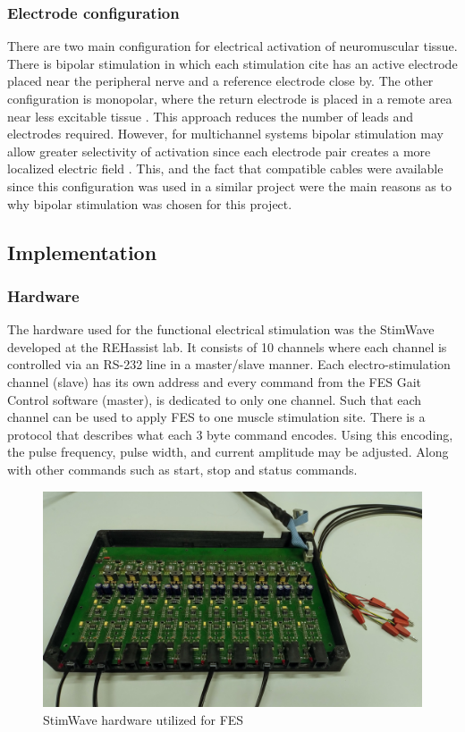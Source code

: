 \subsubsection{Electrode configuration}
There are two main configuration for electrical activation of neuromuscular tissue. There is bipolar stimulation in which each stimulation cite has an active electrode placed near the peripheral nerve and a reference electrode close by. The other configuration is monopolar, where the return electrode is placed in a remote area near less excitable tissue \cite{peckham_functional_2005}. 
This approach reduces the number of leads and electrodes required. However, for multichannel systems bipolar stimulation may allow greater selectivity of activation since each electrode pair creates a more localized electric field \cite{grandjean_recruitment_1986}. This, and the fact that compatible cables were available since this configuration was used in a similar project were the main reasons as to why bipolar stimulation was chosen for this project.

\subsection{Implementation}
\subsubsection{Hardware}
The hardware used for the functional electrical stimulation was the StimWave developed at the REHassist lab. It consists of 10 channels where each channel is controlled via an RS-232 line in a master/slave manner. Each electro-stimulation channel (slave) has its own address and every command from the FES Gait Control software (master), is dedicated to only one channel. Such that each channel can be used to apply FES to one muscle stimulation site. There is a protocol that describes what each 3 byte command encodes. Using this encoding, the pulse frequency, pulse width, and current amplitude may be adjusted. Along with other commands such as start, stop and status commands. 

\begin{figure} [h]
    \centering
    \includegraphics[width=0.8\linewidth]{images/stimwave.jpg}
    \caption{StimWave hardware utilized for FES}
    \label{fig:stimwave}
\end{figure}


